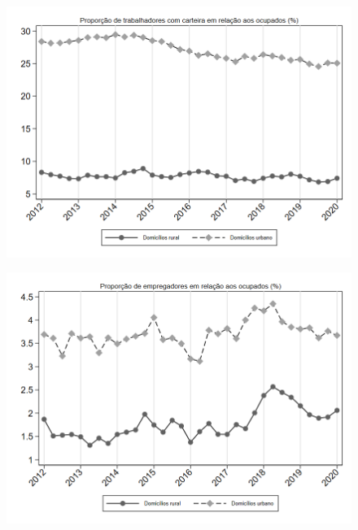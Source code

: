 \begin{frame}[label=_composicao_demografica_rural_urbano_prop_empregadoCC]{}
\textit{\hyperlink{_composicao_demografica_rural_urbano}{}}
\begin{figure}
  \centering
  \includegraphics[width=1.0\linewidth]{../../analysis/output/composicao_demografica/area_geografica/_composicao_demografica_rural_urbano_prop_empregadoCC.png}
  \caption{}
  \label{fig:_composicao_demografica_rural_urbano_prop_empregadoCC}
\end{figure}
\end{frame}

\begin{frame}[label=_composicao_demografica_rural_urbano_prop_empregador]{}
\textit{\hyperlink{_composicao_demografica_rural_urbano}{}}
\begin{figure}
  \centering
  \includegraphics[width=1.0\linewidth]{../../analysis/output/composicao_demografica/area_geografica/_composicao_demografica_rural_urbano_prop_empregador.png}
  \caption{}
  \label{fig:_composicao_demografica_rural_urbano_prop_empregador}
\end{figure}
\end{frame}



